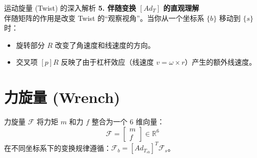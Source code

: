 \begin{mybox}{运动旋量 (Twist) 的深入解析}
\textbf{5. 伴随变换 $[Ad_T]$ 的直观理解} \\
伴随矩阵的作用是改变 Twist 的“观察视角”。当你从一个坐标系 $\{b\}$ 移动到 $\{s\}$ 时：
\begin{itemize}
    \item 旋转部分 $R$ 改变了角速度和线速度的方向。
    \item 交叉项 $[p]R$ 反映了由于杠杆效应（线速度 $v = \omega \times r$）产生的额外线速度。
\end{itemize}
\end{mybox}

\section{力旋量 (Wrench)}
力旋量 $\mathcal{F}$ 将力矩 $m$ 和力 $f$ 整合为一个 6 维向量：
\begin{equation}
\mathcal{F} = \begin{bmatrix} m \\ f \end{bmatrix} \in \mathbb{R}^6
\end{equation}
在不同坐标系下的变换规律遵循：$\mathcal{F}_b = [Ad_{T_{sb}}]^T \mathcal{F}_s$。
